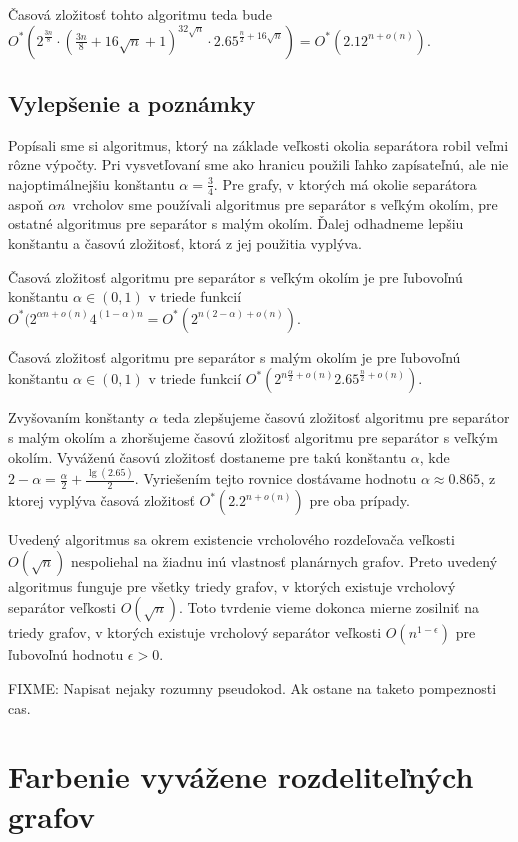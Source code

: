 Časová zložitosť tohto algoritmu teda bude $O^*(2^{\frac{3n}{8}} \cdot (\frac{3n}{8} + 16 \sqrt{n} + 1)^{32 \sqrt{n}} \cdot 2.65^{\frac{n}{2} + 16 \sqrt{n}}) = O^*(2.12^{n + o(n)})$.

\subsection{Vylepšenie a poznámky}

Popísali sme si algoritmus, ktorý na základe veľkosti okolia separátora robil veľmi rôzne výpočty.
Pri vysvetľovaní sme ako hranicu použili ľahko zapísateľnú, ale nie najoptimálnejšiu konštantu
$\alpha = \frac{3}{4}$. Pre grafy, v ktorých má okolie separátora aspoň $\alpha n$ vrcholov
sme používali algoritmus pre separátor s veľkým okolím, pre ostatné algoritmus pre separátor
s malým okolím. Ďalej odhadneme lepšiu konštantu a časovú zložitosť, ktorá z jej použitia vyplýva.

Časová zložitosť algoritmu pre separátor s veľkým okolím je pre ľubovoľnú konštantu $\alpha \in (0, 1)$
v triede funkcií $O^*(2^{\alpha n + o(n)}4^{(1 - \alpha) n} = O^*(2^{n(2 - \alpha) + o(n)})$.

Časová zložitosť algoritmu pre separátor s malým okolím je pre ľubovoľnú konštantu $\alpha \in (0,1)$
v triede funkcií $O^*(2^{n\frac{\alpha}{2} + o(n)} 2.65^{\frac{n}{2} + o(n)})$.

Zvyšovaním konštanty $\alpha$ teda zlepšujeme časovú zložitosť algoritmu pre separátor s malým
okolím a zhoršujeme časovú zložitosť algoritmu pre separátor s veľkým okolím. Vyváženú časovú
zložitosť dostaneme pre takú konštantu $\alpha$, kde $2 - \alpha = \frac{\alpha}{2} + \frac{\lg(2.65)}{2}$.
Vyriešením tejto rovnice dostávame hodnotu $\alpha \approx 0.865$, z ktorej vyplýva časová zložitosť
$O^*(2.2^{n + o(n)})$ pre oba prípady.

Uvedený algoritmus sa okrem existencie vrcholového rozdeľovača veľkosti $O(\sqrt{n})$ nespoliehal
na žiadnu inú vlastnosť planárnych grafov. Preto uvedený algoritmus funguje pre všetky triedy grafov,
v ktorých existuje vrcholový separátor veľkosti $O(\sqrt{n})$. Toto tvrdenie vieme dokonca mierne
zosilniť na triedy grafov, v ktorých existuje vrcholový separátor veľkosti $O(n^{1 - \epsilon})$ pre
ľubovoľnú hodnotu $\epsilon > 0$.

FIXME: Napisat nejaky rozumny pseudokod. Ak ostane na taketo pompeznosti cas.

\section{Farbenie vyvážene rozdeliteľných grafov}

